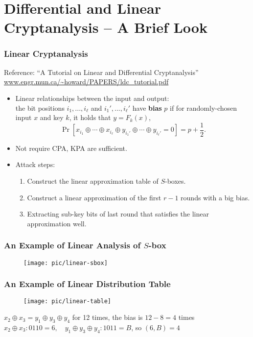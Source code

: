 \section{Differential and Linear Cryptanalysis -- A Brief Look}
\begin{frame}\frametitle{Linear Cryptanalysis}
Reference: ``A Tutorial on Linear and Differential Cryptanalysis'' \url{www.engr.mun.ca/~howard/PAPERS/ldc_tutorial.pdf}
\begin{itemize}
\item Linear relationships between the input and output: \\
the bit positions $i_1, ... ,i_\ell$ and $i_1', ... , i_\ell'$ have \textbf{bias} $p$ if for randomly-chosen input $x$ and key $k$, it holds that $y=F_k(x)$,
\[ \Pr [x_{i_1} \oplus \cdots \oplus x_{i_\ell} \oplus y_{i_1'} \oplus \cdots \oplus y_{i_\ell'} = 0] = p+\frac{1}{2}.
\]
\item Not require CPA, KPA are sufficient.
\item Attack steps:
\begin{enumerate}
\item Construct the linear approximation table of $S$-boxes.
\item Construct a linear approximation of the first $r-1$ rounds with a big bias.
\item Extracting sub-key bits of last round that satisfies the linear approximation well.
\end{enumerate}
\end{itemize}
\end{frame}
\begin{frame}\frametitle{An Example of Linear Analysis of $S$-box}
\begin{figure}
\begin{center}
\texttt{[image: pic/linear-sbox]} 
\end{center}
\end{figure}
\end{frame}
\begin{frame}\frametitle{An Example of Linear Distribution Table}
\begin{figure}
\begin{center}
\texttt{[image: pic/linear-table]} 
\end{center}
\end{figure}
$x_{2}\oplus x_{3} = y_{1}\oplus y_{3} \oplus y_{4}$ for 12 times, the bias is $12 - 8 =4$ times
$x_{2}\oplus x_{3}: 0110 = 6,\quad y_{1}\oplus y_{3} \oplus y_{4}: 1011=B$, so $(6, B) =4$
\end{frame}
